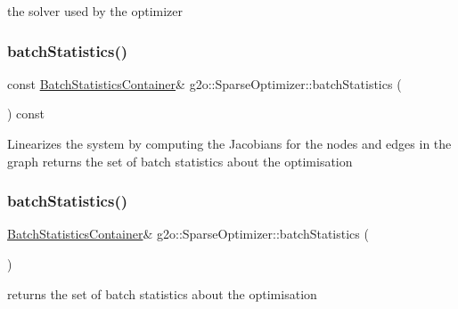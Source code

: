 the solver used by the optimizer 

\mbox{\label{classg2o_1_1_sparse_optimizer_a7eede0614bcccf8707480c53071da8f8}} 
\subsubsection{\texorpdfstring{batch\+Statistics()}{batchStatistics()}\hspace{0.1cm}{\footnotesize\ttfamily [1/2]}}
{\footnotesize\ttfamily const \mbox{\hyperlink{namespaceg2o_a526b32fde21f83173acb2bb29db68275}{Batch\+Statistics\+Container}}\& g2o\+::\+Sparse\+Optimizer\+::batch\+Statistics (\begin{DoxyParamCaption}{ }\end{DoxyParamCaption}) const\hspace{0.3cm}{\ttfamily [inline]}}

Linearizes the system by computing the Jacobians for the nodes and edges in the graph returns the set of batch statistics about the optimisation \mbox{\label{classg2o_1_1_sparse_optimizer_aa93ecf8d3b99e2eef3709a5c70cc8632}} 
\subsubsection{\texorpdfstring{batch\+Statistics()}{batchStatistics()}\hspace{0.1cm}{\footnotesize\ttfamily [2/2]}}
{\footnotesize\ttfamily \mbox{\hyperlink{namespaceg2o_a526b32fde21f83173acb2bb29db68275}{Batch\+Statistics\+Container}}\& g2o\+::\+Sparse\+Optimizer\+::batch\+Statistics (\begin{DoxyParamCaption}{ }\end{DoxyParamCaption})\hspace{0.3cm}{\ttfamily [inline]}}

returns the set of batch statistics about the optimisation \mbox{\label{classg2o_1_1_sparse_optimizer_a8c6af9785e85153ade1490beacad73ce}} 
